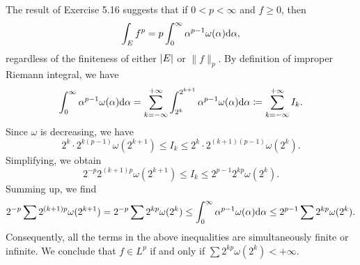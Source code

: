 \begin{exercise}{5.18}
  The result of Exercise 5.16 suggests that if $0 < p < \infty$ and $f \ge 0$, then
  \[
    \int_E f^p = p \int_0^{\infty} \alpha^{p-1} \omega(\alpha) \mathrm{d} \alpha,
  \]
  regardless of the finiteness of either $\left\vert E\right\vert$ or $\lVert f \rVert_p$.
  By definition of improper Riemann integral, we have
  \[
    \int_0^\infty \alpha^{p-1} \omega(\alpha) \mathrm{d} \alpha =
    \sum_{k = -\infty}^{+\infty}
    \int_{2^k}^{2^{k+1}} \alpha^{p-1} \omega(\alpha) \mathrm{d} \alpha
    \coloneqq \sum_{k = -\infty}^{+\infty} I_k.
  \]
  Since $\omega$ is decreasing, we have
  \[
    2^k \cdot 2^{k(p-1)} \omega(2^{k+1}) \le I_k \le 2^k \cdot 2^{(k+1)(p-1)} \omega(2^k).
  \]
  Simplifying, we obtain
  \[
    2^{-p} 2^{(k+1)p} \omega(2^{k+1}) \le I_k \le 2^{p-1} 2^{kp} \omega(2^k).
  \]
  Summing up, we find
  \[
    2^{-p} \sum 2^{(k+1)p} \omega(2^{k+1})
    = 2^{-p} \sum 2^{kp} \omega(2^k)
    \le \int_0^\infty \alpha^{p-1} \omega(\alpha) \mathrm{d} \alpha
    \le 2^{p-1} \sum 2^{kp} \omega(2^k).
  \]
  Consequently, all the terms in the above inequalities
  are simultaneously finite or infinite.
  We conclude that $f \in L^p$ if and only if $\sum 2^{kp} \omega(2^k) < + \infty$.
\end{exercise}
